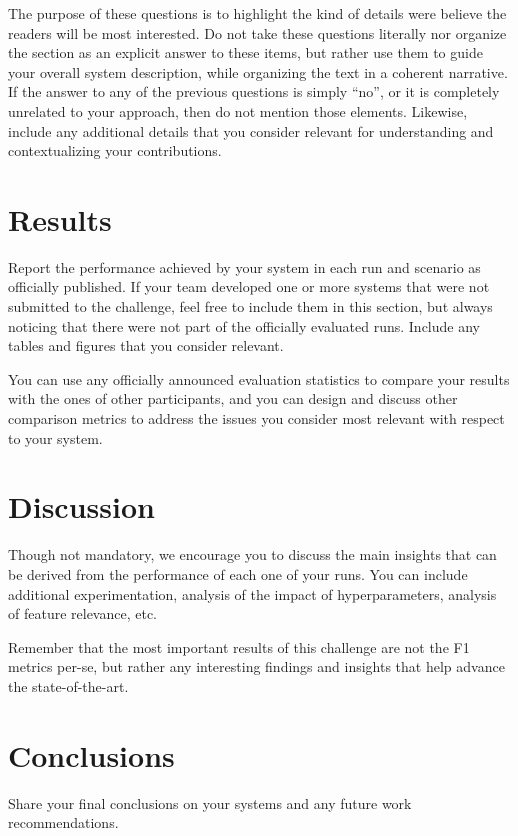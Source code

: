 \documentclass[]{llncs}
\begin{document}
The purpose of these questions is to highlight the kind
of details were believe the readers will be most interested. 
Do not take these questions literally nor organize the section as an explicit answer
to these items, but rather use them to guide your overall system
description, while organizing the text in a coherent narrative.
If the answer to any of the previous questions is simply ``no'', or it is completely unrelated
to your approach, then do not mention those elements.
Likewise, include any additional details that you consider relevant for understanding and
contextualizing your contributions.

\section{Results}

Report the performance achieved by your system in each run and scenario as officially published.
If your team developed one or more systems that were not submitted to the challenge, feel free to include them in this section, but always noticing that there were not part of the officially evaluated runs.
Include any tables and figures that you consider relevant.

You can use any officially announced evaluation statistics to compare your results with the ones of other participants, and you can design and discuss other comparison metrics to address the
issues you consider most relevant with respect to your system.

\section{Discussion}

Though not mandatory, we encourage you to discuss the main insights that can be derived from the performance of each one of your runs. You can include additional experimentation, analysis of the impact of hyperparameters, analysis of feature relevance, etc.

Remember that the most important results of this challenge are not the F1 metrics per-se, but rather
any interesting findings and insights that help advance the state-of-the-art.

\section{Conclusions}

Share your final conclusions on your systems and any future work recommendations.



\end{document}

